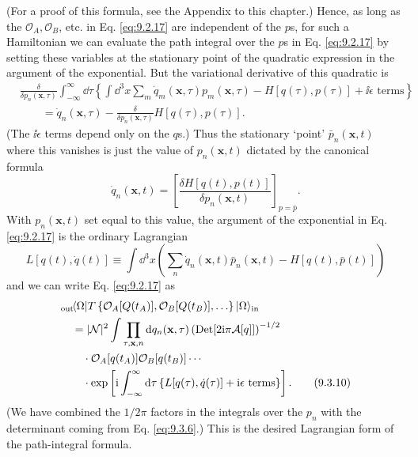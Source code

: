 (For a proof of this formula, see the Appendix to this chapter.) Hence, as
long as the $\mathcal O_A,\mathcal O_B$, etc. in Eq. \eqref{eq:9.2.17} are independent
of the $p$s, for such a Hamiltonian we can evaluate the path integral over the
$p$s in Eq. \eqref{eq:9.2.17} by setting these variables at the stationary point of the
quadratic expression in the argument of the exponential. But the variational
derivative of this quadratic is
\begin{align*}
&\frac{\delta}{\delta p_n(\mathbf{x},\tau)}
 \int_{-\infty}^{\infty}\dd\tau
 \left\{\int \dd^3x\sum_m\dot q_m(\mathbf{x},\tau)p_m(\mathbf{x},\tau)
 -H[q(\tau),p(\tau)]+\ii\epsilon\text{ terms}\right\}
\\
&\qquad=\dot q_n(\mathbf{x},\tau)
 -\frac{\delta}{\delta p_n(\mathbf{x},\tau)}H[q(\tau),p(\tau)].
\end{align*}
(The $\ii\epsilon$ terms depend only on the $q$s.) Thus the stationary `point'
$\bar p_n(\mathbf{x},t)$ where this vanishes is just the value of
$p_n(\mathbf{x},t)$ dictated by the canonical formula
\begin{equation}
\dot q_n(\mathbf{x},t)
=\left[\frac{\delta H[q(t),p(t)]}{\delta p_n(\mathbf{x},t)}\right]_{p=\bar p}.
\tag{9.3.8}\label{eq:9.3.8}
\end{equation}
With $p_n(\mathbf{x},t)$ set equal to this value, the argument of the
exponential in Eq. \eqref{eq:9.2.17} is the ordinary Lagrangian
\begin{equation}
L[q(t),\dot q(t)]\equiv\int \dd^3x\left(
 \sum_n\dot q_n(\mathbf{x},t)\bar p_n(\mathbf{x},t)
 -H[q(t),\bar p(t)]\right)
\tag{9.3.9}\label{eq:9.3.9}
\end{equation}
and we can write Eq. \eqref{eq:9.2.17} as
\begin{align}
&{}_{\mathrm{out}}\!\langle \Omega\rvert T\left\{
 \mathcal O_A[Q(t_A)],\mathcal O_B[Q(t_B)],\ldots\right\}
 \lvert \Omega\rangle_{\mathrm{in}}
\notag\\
&\quad=|\mathcal N|^2\int\prod_{\tau,\mathbf{x},n}\mathop{}\!\mathrm{d} q_n(\mathbf{x},\tau)
 \left(\operatorname{Det}[2\mathrm{i}\pi\mathcal A[q]]\right)^{-1/2}
\notag\\
&\qquad\cdot\mathcal O_A[q(t_A)]\mathcal O_B[q(t_B)]\cdots
\notag\\
&\qquad\cdot\exp\left[\mathrm{i}\int_{-\infty}^{\infty}\mathop{}\!\mathrm{d}\tau
 \left\{L[q(\tau),\dot q(\tau)]+\mathrm{i}\epsilon\text{ terms}\right\}\right].
\tag{9.3.10}\label{eq:9.3.10}
\end{align}
(We have combined the $1/2\pi$ factors in the integrals over the $p_n$ with
the determinant coming from Eq. \eqref{eq:9.3.6}.) This is the desired Lagrangian form
of the path-integral formula.

